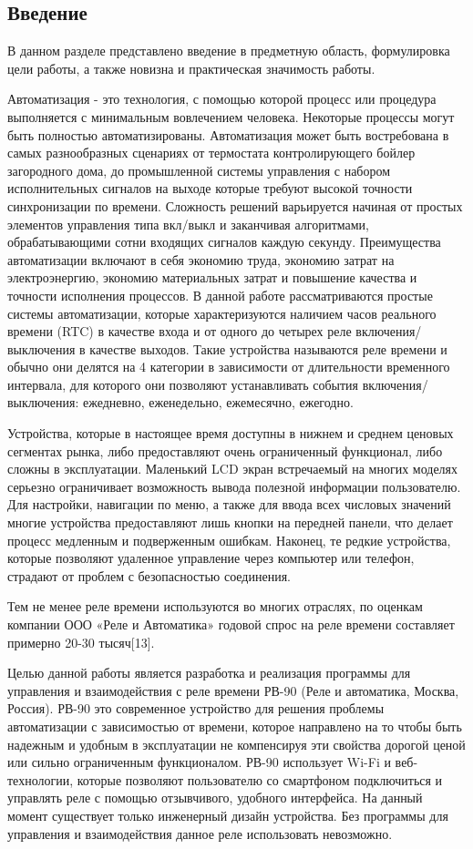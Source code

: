 \subsection{Введение}

В данном разделе представлено введение в предметную область, формулировка цели работы, а также новизна и практическая значимость работы.

Автоматизация - это технология, с помощью которой процесс или процедура выполняется с минимальным вовлечением человека. Некоторые процессы могут быть полностью автоматизированы. Автоматизация может быть востребована в самых разнообразных сценариях от термостата контролирующего бойлер загородного дома, до промышленной системы управления с набором исполнительных сигналов на выходе которые требуют высокой точности синхронизации по времени. Сложность решений варьируется начиная от простых элементов управления типа вкл/выкл и заканчивая алгоритмами, обрабатывающими сотни входящих сигналов каждую секунду. Преимущества автоматизации включают в себя экономию труда, экономию затрат на электроэнергию, экономию материальных затрат и повышение качества и точности исполнения процессов. В данной работе  рассматриваются простые системы автоматизации, которые характеризуются наличием часов реального времени (RTC) в качестве входа и от одного до четырех реле включения/выключения в качестве выходов. Такие устройства называются реле времени и обычно они делятся на 4 категории в зависимости от длительности временного интервала, для которого они позволяют устанавливать события включения/выключения: ежедневно, еженедельно, ежемесячно, ежегодно.

Устройства, которые в настоящее время доступны в нижнем и среднем ценовых  сегментах рынка, либо предоставляют очень ограниченный функционал, либо сложны в эксплуатации. Маленький LCD экран встречаемый на многих моделях серьезно ограничивает возможность вывода полезной информации пользователю. Для настройки, навигации по меню, а также для ввода всех числовых значений многие устройства предоставляют лишь кнопки на передней панели, что делает процесс медленным и подверженным ошибкам. Наконец, те редкие устройства, которые позволяют удаленное управление через компьютер или телефон, страдают от проблем с безопасностью соединения.

Тем не менее реле времени используются во многих отраслях, по оценкам компании ООО «Реле и Автоматика» годовой спрос на реле времени составляет примерно 20-30 тысяч[13].

Целью данной работы является разработка и реализация программы для управления и взаимодействия с реле времени РВ-90 (Реле и автоматика, Москва, Россия). РВ-90 это современное устройство для решения проблемы автоматизации с зависимостью от времени, которое направлено на то чтобы быть надежным и удобным в эксплуатации не компенсируя эти свойства дорогой ценой или сильно ограниченным функционалом. РВ-90 использует Wi-Fi и веб-технологии, которые позволяют пользователю со смартфоном подключиться и управлять реле с помощью отзывчивого, удобного интерфейса. На данный момент существует только инженерный дизайн устройства. Без программы для управления и взаимодействия данное реле использовать невозможно.

